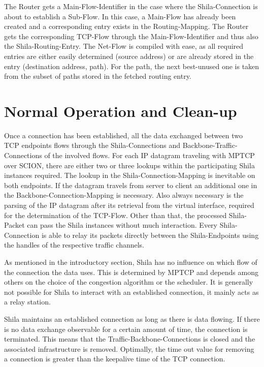 The Router gets a Main-Flow-Identifier in the case where the Shila-Connection is about to establish a Sub-Flow. In this case, a Main-Flow has already been created and a corresponding entry exists in the Routing-Mapping. The Router gets the corresponding TCP-Flow through the Main-Flow-Identifier and thus also the Shila-Routing-Entry. The Net-Flow is compiled with ease, as all required entries are either easily determined (source address) or are already stored in the entry (destination address, path). For the path, the next best-unused one is taken from the subset of paths stored in the fetched routing entry.

\section{Normal Operation and Clean-up}
\label{sec:ImplementationNormalOperationAndCleanUp}

Once a connection has been established, all the data exchanged between two TCP endpoints flows through the Shila-Connections and Backbone-Traffic-Connections of the involved flows. For each IP datagram traveling with MPTCP over SCION, there are either two or three lookups within the participating Shila instances required. The lookup in the Shila-Connection-Mapping is inevitable on both endpoints. If the datagram travels from server to client an additional one in the Backbone-Connection-Mapping is necessary. Also always necessary is the parsing of the IP datagram after its retrieval from the virtual interface, required for the determination of the TCP-Flow. Other than that, the processed Shila-Packet can pass the Shila instances without much interaction. Every Shila-Connection is able to relay its packets directly between the Shila-Endpoints using the handles of the respective traffic channels.

As mentioned in the introductory section, Shila has no influence on which flow of the connection the data uses. This is determined by MPTCP and depends among others on the choice of the congestion algorithm or the scheduler. It is generally not possible for Shila to interact with an established connection, it mainly acts as a relay station.

Shila maintains an established connection as long as there is data flowing. If there is no data exchange observable for a certain amount of time, the connection is terminated. This means that the Traffic-Backbone-Connections is closed and the associated infrastructure is removed. Optimally, the time out value for removing a connection is greater than the keepalive time \cite{KeepaliveWiki} of the TCP connection.

